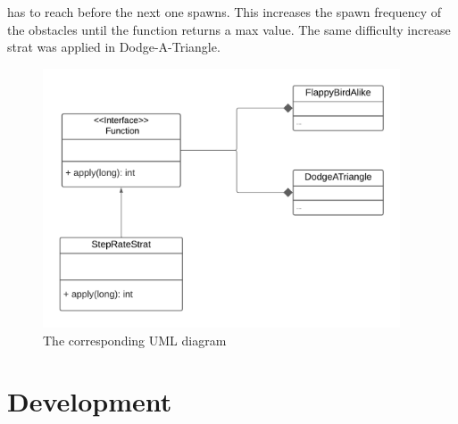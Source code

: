 \documentclass[a4paper,12pt]{report}
\begin{document}
has to reach before the next one spawns. This increases the spawn frequency of the obstacles until the function returns a max value.
The same difficulty increase strat was applied in Dodge-A-Triangle.
\begin{figure}[ht]
	\centering
	\includegraphics[width=300pt]{res/StepRateStrat.pdf}
	\caption{The corresponding UML diagram}
\end{figure}

\chapter{Development}
\end{document}
